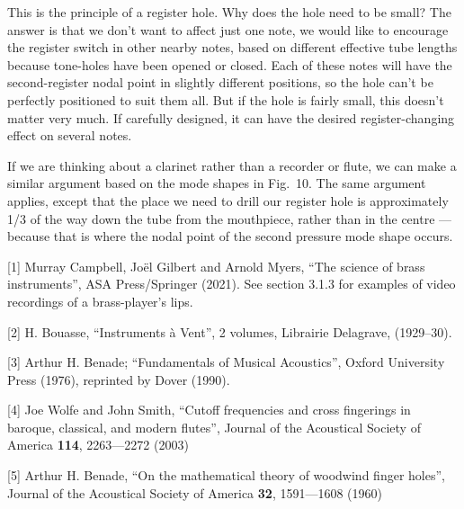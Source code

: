  This is the principle of a register hole. Why does the hole need to be small? 
  The answer is that we don’t want to affect just one note, we would like to 
  encourage the register switch in other nearby notes, based on different 
  effective tube lengths because tone-holes have been opened or closed. Each of 
  these notes will have the second-register nodal point in slightly different 
  positions, so the hole can’t be perfectly positioned to suit them all. But if 
  the hole is fairly small, this doesn’t matter very much. If carefully 
  designed, it can have the desired register-changing effect on several notes. 

  If we are thinking about a clarinet rather than a recorder or flute, we can 
  make a similar argument based on the mode shapes in Fig.\ 10. The same 
  argument applies, except that the place we need to drill our register hole is 
  approximately 1/3 of the way down the tube from the mouthpiece, rather than 
  in the centre — because that is where the nodal point of the second pressure 
  mode shape occurs. 



  \sectionreferences{}[1] Murray Campbell, Joël Gilbert and Arnold Myers, “The 
  science of brass instruments”, ASA Press/Springer (2021). See section 3.1.3 
  for examples of video recordings of a brass-player's lips. 

  [2] H. Bouasse, “Instruments à Vent”, 2 volumes, Librairie Delagrave, 
  (1929–30). 

  [3] Arthur H. Benade; “Fundamentals of Musical Acoustics”, Oxford University 
  Press (1976), reprinted by Dover (1990). 

  [4] Joe Wolfe and John Smith, “Cutoff frequencies and cross fingerings in 
  baroque, classical, and modern flutes”, Journal of the Acoustical Society of 
  America \textbf{114}, 2263—2272 (2003) 

  [5] Arthur H. Benade, “On the mathematical theory of woodwind finger holes”, 
  Journal of the Acoustical Society of America \textbf{32}, 1591—1608 (1960) 